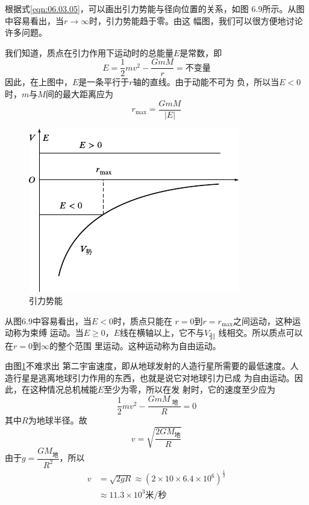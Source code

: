 根据式\eqref{eqn:06.03.05}，可以画出引力势能与径向位置的关系，如图
6.9所示。从图中容易看出，当$ r \to \infty $时，引力势能趋于零。由这
幅图，我们可以很方便地讨论许多问题。

我们知道，质点在引力作用下运动时的总能量$ E $是常数，即
\begin{equation*}
  E = \frac { 1 } { 2 } m v ^ { 2 } - \frac { G m M } { r } = \text{不变量}
\end{equation*}
因此，在上图中，$ E $是一条平行于$ r $轴的直线。由于动能不可为
负，所以当$ E < 0 $时，$ m $与$ M $间的最大距离应为
\begin{equation*}
  r _ { \max } = \frac { G m M } { | E | }
\end{equation*}
\begin{figure}
  \vspace{-1.3em}
  \centering
  \includegraphics{figure/fig06.09}
  \caption{引力势能}
  \label{fig:06.09}
\end{figure}
从图6.9中容易看出，当$ E < 0 $时，质点只能在
$ r = 0 $到$ r = r _ { \max } $之间运动，这种运动称为束缚
运动。当$ E \geqslant 0 $，$ E $线在横轴以上，它不与$ V_\text{引} $
线相交。所以质点可以在$ r = 0 $到$ \infty $的整个范围
里运动。这种运动称为自由运动。

由图\ref{fig:06.09}\;不难求出
第二宇宙速度，即从地球发射的人造行星所需要的最低速度。人
造行星是逃离地球引力作用的东西，也就是说它对地球引力已成
为自由运动。因此，在这种情况总机械能$ E $至少为零，所以在发
射时，它的速度至少应为
\begin{equation*}
  \frac { 1 } { 2 } m v ^ { 2 } - \frac { G m M _ \text { 地 } } { R } = 0
\end{equation*}
其中$ R $为地球半径。故
\begin{equation*}
  v = \sqrt{\frac { 2 G M _ \text{地} } { R } }
\end{equation*}
由于$ g = \dfrac { G M _ \text{地} } { R ^ { 2 } } $，所以
\clearpage
\begin{equation*}
  \begin{aligned}
    v & = \sqrt { 2 g R } \approx \left( 2 \times 10 \times 6.4 \times 10 ^ { 6 } \right) ^ { \frac { 1 } { 2 } } \\
      & \approx 11.3 \times 10 ^ { 3 } \text{米/秒}
  \end{aligned}
\end{equation*}

